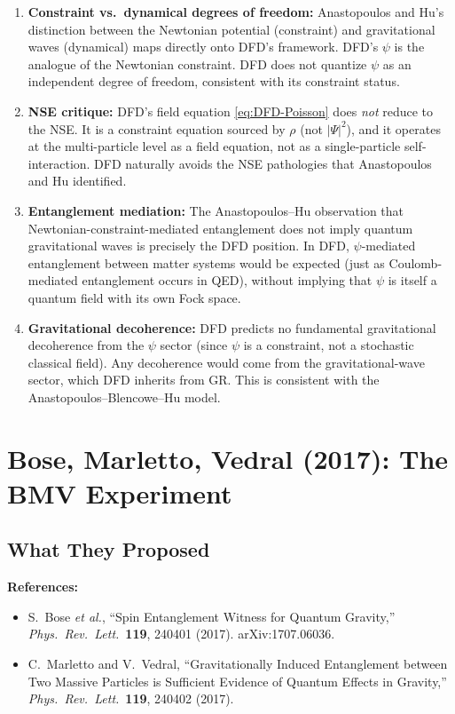 \documentclass[12pt,a4paper]{article}
\begin{document}
\begin{enumerate}
\item \textbf{Constraint vs.\ dynamical degrees of freedom:} Anastopoulos and Hu's distinction between the Newtonian potential (constraint) and gravitational waves (dynamical) maps directly onto DFD's framework. DFD's $\psi$ is the analogue of the Newtonian constraint. DFD does not quantize $\psi$ as an independent degree of freedom, consistent with its constraint status.

\item \textbf{NSE critique:} DFD's field equation \eqref{eq:DFD-Poisson} does \emph{not} reduce to the NSE. It is a constraint equation sourced by $\rho$ (not $|\Psi|^2$), and it operates at the multi-particle level as a field equation, not as a single-particle self-interaction. DFD naturally avoids the NSE pathologies that Anastopoulos and Hu identified.

\item \textbf{Entanglement mediation:} The Anastopoulos--Hu observation that Newtonian-constraint-mediated entanglement does not imply quantum gravitational waves is precisely the DFD position. In DFD, $\psi$-mediated entanglement between matter systems would be expected (just as Coulomb-mediated entanglement occurs in QED), without implying that $\psi$ is itself a quantum field with its own Fock space.

\item \textbf{Gravitational decoherence:} DFD predicts no fundamental gravitational decoherence from the $\psi$ sector (since $\psi$ is a constraint, not a stochastic classical field). Any decoherence would come from the gravitational-wave sector, which DFD inherits from GR. This is consistent with the Anastopoulos--Blencowe--Hu model.
\end{enumerate}


\section{Bose, Marletto, Vedral (2017): The BMV Experiment}
\label{sec:bmv}

\subsection{What They Proposed}

\textbf{References:}
\begin{itemize}
\item S.\ Bose \textit{et al.}, ``Spin Entanglement Witness for Quantum Gravity,'' \textit{Phys.\ Rev.\ Lett.}\ \textbf{119}, 240401 (2017). arXiv:1707.06036.
\item C.\ Marletto and V.\ Vedral, ``Gravitationally Induced Entanglement between Two Massive Particles is Sufficient Evidence of Quantum Effects in Gravity,'' \textit{Phys.\ Rev.\ Lett.}\ \textbf{119}, 240402 (2017).
\end{itemize}
\end{document}
